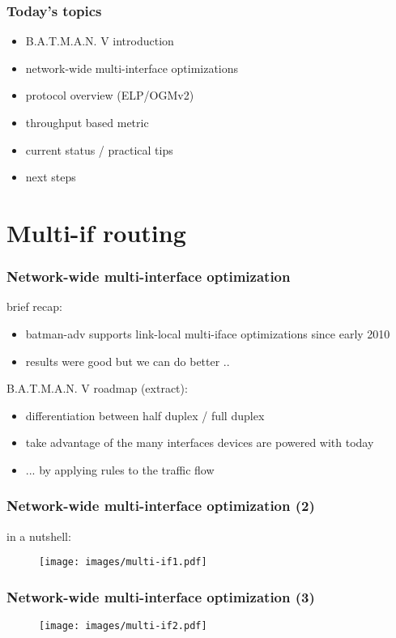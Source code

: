 \documentclass[slidestop]{beamer}
\begin{document}
\begin{frame}[c]
	\frametitle{Today's topics}
	\begin{itemize}
		\item B.A.T.M.A.N. V introduction
		\item network-wide multi-interface optimizations
		\item protocol overview (ELP/OGMv2)
		\item throughput based metric
		\item current status / practical tips
		\item next steps
	\end{itemize}
\end{frame}

\section{Multi-if routing}
\begin{frame}[c]
	\frametitle{Network-wide multi-interface optimization}

	brief recap:

	\begin{itemize}
		\item batman-adv supports link-local multi-iface optimizations since early 2010
		\item results were good but we can do better ..
	\end{itemize}

	\addvspace{1.0cm}

	B.A.T.M.A.N. V roadmap (extract):

	\begin{itemize}
		\item differentiation between half duplex / full duplex
		\item take advantage of the many interfaces devices are powered with today
		\item ... by applying rules to the traffic flow
	\end{itemize}
\end{frame}

\begin{frame}[c]
	\frametitle{Network-wide multi-interface optimization (2)}

	in a nutshell:
	\begin{figure}
		\centering
		\texttt{[image: images/multi-if1.pdf]}
	\end{figure}
\end{frame}

\begin{frame}[c]
	\frametitle{Network-wide multi-interface optimization (3)}

	\begin{figure}
		\centering
		\texttt{[image: images/multi-if2.pdf]}
	\end{figure}
\end{frame}
\end{document}
